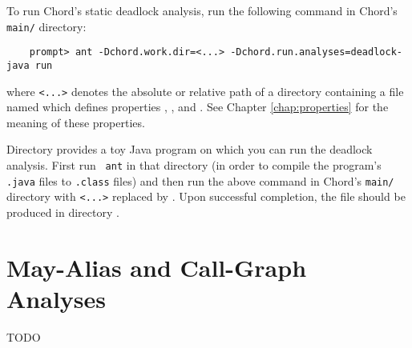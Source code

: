 To run Chord's static deadlock analysis,  run the following
command in Chord's {\tt main/} directory:

\begin{verbatim}
    prompt> ant -Dchord.work.dir=<...> -Dchord.run.analyses=deadlock-java run
\end{verbatim}

where {\tt <...>} denotes the absolute or relative path of a directory
containing a file named  which defines
properties , , and
.  See Chapter \ref{chap:properties} for the
meaning of these properties.

Directory  provides a toy Java
program on which you can run the deadlock analysis.  First run {\tt
  ant} in that directory (in order to compile the program's {\tt
  .java} files to {\tt .class} files) and then run the above command
in Chord's {\tt main/} directory with {\tt <...>} replaced by
.  Upon successful completion, the
file  should be produced in directory
.

\section{May-Alias and Call-Graph Analyses}

TODO
